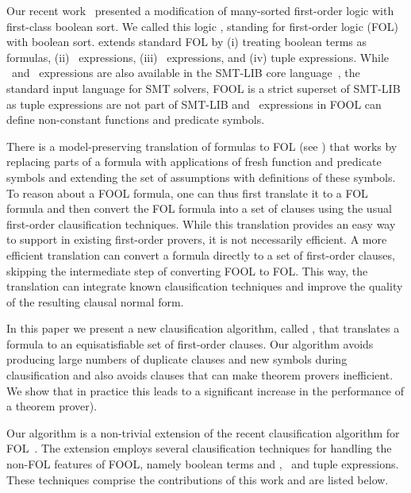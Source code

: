 Our recent work~\cite{FOOL} presented a modification of many-sorted first-order logic with first-class boolean sort. We called this logic \folb{}, standing for first-order logic (FOL) with boolean sort. \folb{} extends standard FOL by (i) treating boolean terms as formulas, (ii) \ITE\ expressions, (iii) \LETIN\ expressions, and (iv) tuple expressions. While \ITE\ and \LETIN\ expressions are also available in the SMT-LIB core language~\cite{BarFT-SMTLIB}, the standard input language for SMT solvers, FOOL is a strict superset of SMT-LIB as tuple expressions are not part of SMT-LIB and \LETIN\ expressions in FOOL can define non-constant functions and predicate symbols. 

There is a model-preserving translation of \folb{} formulas to FOL (see \cite{FOOL})
that works by replacing parts of a \folb{} formula with applications of fresh function and predicate symbols and extending the set of assumptions with definitions of these symbols.
To reason about a FOOL formula, one can thus 
first translate it to a FOL formula and then convert the FOL formula into a set of clauses
using the usual first-order clausification techniques. 
While this translation provides an easy way to support \folb{} in existing first-order provers,
it is not necessarily efficient.
A more efficient translation can convert a \folb{} formula directly to a set of first-order clauses, skipping the intermediate step of converting FOOL to FOL. This way, the translation can integrate known clausification techniques and improve the quality of the resulting clausal normal form. 

In this paper  we present a new clausification algorithm, called \nfcnf{},  that translates a \folb{} formula to an equisatisfiable set of first-order clauses. 
Our algorithm 
avoids producing large numbers  of duplicate clauses and new symbols during clausification and 
also avoids clauses that can make theorem provers inefficient.
We show that in practice this leads to a significant increase in the performance of a theorem prover).

Our \nfcnf{} algorithm  is a non-trivial  extension of the recent \newcnf{} clausification algorithm for FOL~\cite{newcnf_fol}. The extension employs several clausification techniques for handling the non-FOL features of FOOL, namely boolean terms and \ITE, \LETIN\ and tuple expressions. These techniques comprise the contributions of this work and are listed below.

